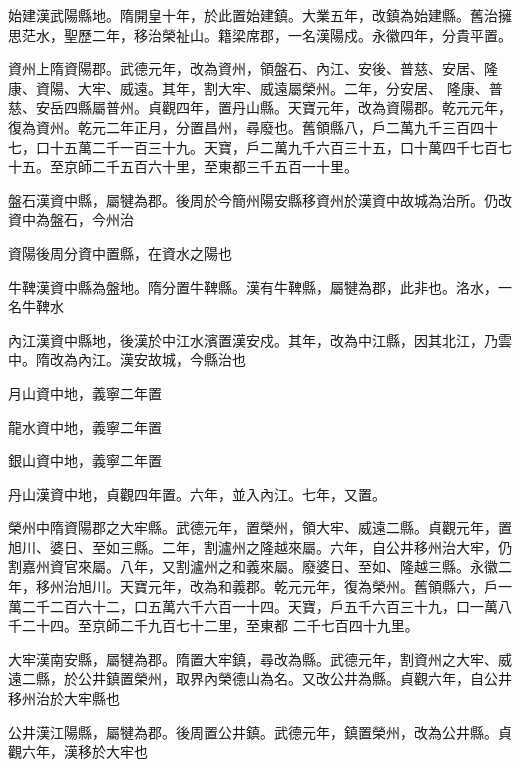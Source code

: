 \begin{pinyinscope}
 始建漢武陽縣地。隋開皇十年，於此置始建鎮。大業五年，改鎮為始建縣。舊治擁思茫水，聖歷二年，移治榮祉山。籍梁席郡，一名漢陽戍。永徽四年，分貴平置。



 資州上隋資陽郡。武德元年，改為資州，領盤石、內江、安後、普慈、安居、隆康、資陽、大牢、威遠。其年，割大牢、威遠屬榮州。二年，分安居、
 隆康、普慈、安岳四縣屬普州。貞觀四年，置丹山縣。天寶元年，改為資陽郡。乾元元年，復為資州。乾元二年正月，分置昌州，尋廢也。舊領縣八，戶二萬九千三百四十七，口十五萬二千一百三十九。天寶，戶二萬九千六百三十五，口十萬四千七百七十五。至京師二千五百六十里，至東都三千五百一十里。



 盤石漢資中縣，屬犍為郡。後周於今簡州陽安縣移資州於漢資中故城為治所。仍改資中為盤石，今州治



 資陽後周分資中置縣，在資水之陽也



 牛鞞漢資中縣為盤地。隋分置牛鞞縣。漢有牛鞞縣，屬犍為郡，此非也。洛水，一名牛鞞水



 內江漢資中縣地，後漢於中江水濱置漢安戍。其年，改為中江縣，因其北江，乃雲中。隋改為內江。漢安故城，今縣治也



 月山資中地，義寧二年置



 龍水資中地，義寧二年置



 銀山資中地，義寧二年置



 丹山漢資中地，貞觀四年置。六年，並入內江。七年，又置。



 榮州中隋資陽郡之大牢縣。武德元年，置榮州，領大牢、威遠二縣。貞觀元年，置旭川、婆日、至如三縣。二年，割瀘州之隆越來屬。六年，自公井移州治大牢，仍割嘉州資官來屬。八年，又割瀘州之和義來屬。廢婆日、至如、隆越三縣。永徽二年，移州治旭川。天寶元年，改為和義郡。乾元元年，復為榮州。舊領縣六，戶一萬二千二百六十二，口五萬六千六百一十四。天寶，戶五千六百三十九，口一萬八千二十四。至京師二千九百七十二里，至東都
 二千七百四十九里。



 大牢漢南安縣，屬犍為郡。隋置大牢鎮，尋改為縣。武德元年，割資州之大牢、威遠二縣，於公井鎮置榮州，取界內榮德山為名。又改公井為縣。貞觀六年，自公井移州治於大牢縣也



 公井漢江陽縣，屬犍為郡。後周置公井鎮。武德元年，鎮置榮州，改為公井縣。貞觀六年，漢移於大牢也




\end{pinyinscope}
